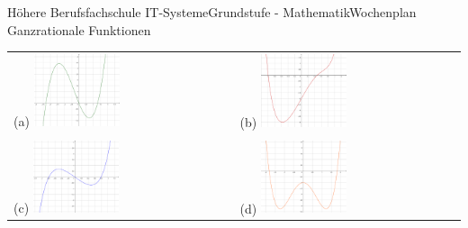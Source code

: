 \documentclass[oneside,openany,headings=optiontotoc,11pt,numbers=noenddot]{scrreprt}
\begin{document}
\begin{worksheet}{Höhere Berufsfachschule IT-Systeme}{Grundstufe - Mathematik}{Wochenplan Ganzrationale Funktionen}
\begin{framed}
\begin{tabularx}{\textwidth}{XX}
				(a) \includegraphics[width=0.4\textwidth,align=t]{../99_Bilder/WP/WP9T2a.png} & (b) \includegraphics[width=0.4\textwidth,align=t]{../99_Bilder/WP/WP9T2b.png}\\
				\\
				(c) \includegraphics[width=0.4\textwidth,align=t]{../99_Bilder/WP/WP9T2c.png} & (d) \includegraphics[width=0.4\textwidth,align=t]{../99_Bilder/WP/WP9T2d.png}\\
			\end{tabularx}
			\begin{tabularx}{\textwidth}{XX}

\end{tabularx}
\end{framed}
\end{worksheet}
\end{document}
